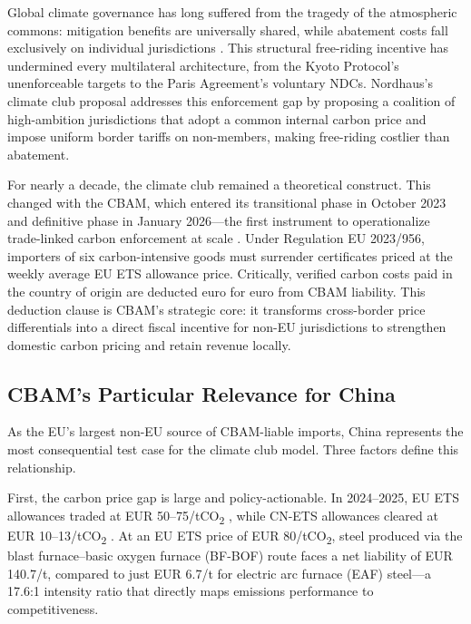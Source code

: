 \documentclass[letterpaper, 10pt, conference]{ieeeconf}
\begin{document}
Global climate governance has long suffered from the tragedy of the atmospheric commons: mitigation benefits are universally shared, while abatement costs fall exclusively on individual jurisdictions \citep{Hardin1968}. This structural free-riding incentive has undermined every multilateral architecture, from the Kyoto Protocol's unenforceable targets to the Paris Agreement's voluntary NDCs. Nordhaus's \citeyearpar{Nordhaus2015} climate club proposal addresses this enforcement gap by proposing a coalition of high-ambition jurisdictions that adopt a common internal carbon price and impose uniform border tariffs on non-members, making free-riding costlier than abatement.

For nearly a decade, the climate club remained a theoretical construct. This changed with the CBAM, which entered its transitional phase in October 2023 and definitive phase in January 2026---the first instrument to operationalize trade-linked carbon enforcement at scale \citep{EURegulation2023}. Under Regulation EU 2023/956, importers of six carbon-intensive goods must surrender certificates priced at the weekly average EU ETS allowance price. Critically, verified carbon costs paid in the country of origin are deducted euro for euro from CBAM liability. This deduction clause is CBAM's strategic core: it transforms cross-border price differentials into a direct fiscal incentive for non-EU jurisdictions to strengthen domestic carbon pricing and retain revenue locally.

\subsection{CBAM's Particular Relevance for China}

As the EU's largest non-EU source of CBAM-liable imports, China represents the most consequential test case for the climate club model. Three factors define this relationship.

First, the carbon price gap is large and policy-actionable. In 2024--2025, EU ETS allowances traded at EUR 50--75/tCO\textsubscript{2} \citep{EURegulation2023}, while CN-ETS allowances cleared at EUR 10--13/tCO\textsubscript{2} \citep{MEE2023}. At an EU ETS price of EUR 80/tCO\textsubscript{2}, steel produced via the blast furnace--basic oxygen furnace (BF-BOF) route faces a net liability of EUR 140.7/t, compared to just EUR 6.7/t for electric arc furnace (EAF) steel---a 17.6:1 intensity ratio that directly maps emissions performance to competitiveness.
\end{document}
